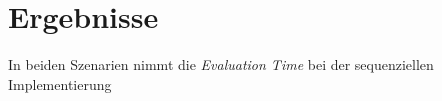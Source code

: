 \section{Ergebnisse}
\label{sec:results_optimziation}











In beiden Szenarien nimmt die \emph{Evaluation Time} bei der sequenziellen Implementierung 





